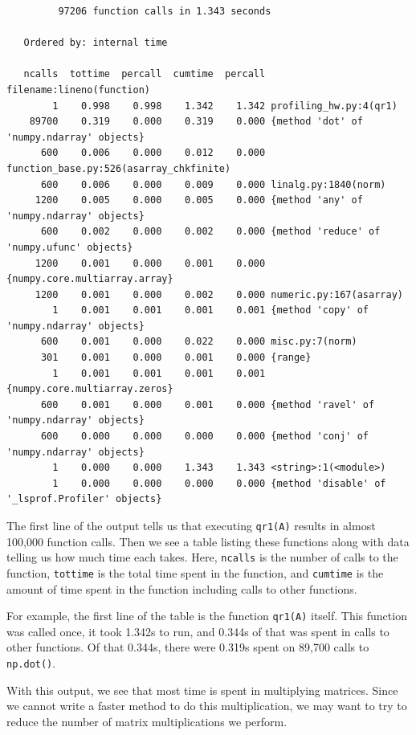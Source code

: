 {\scriptsize
\begin{verbatim}
         97206 function calls in 1.343 seconds

   Ordered by: internal time

   ncalls  tottime  percall  cumtime  percall filename:lineno(function)
        1    0.998    0.998    1.342    1.342 profiling_hw.py:4(qr1)
    89700    0.319    0.000    0.319    0.000 {method 'dot' of 'numpy.ndarray' objects}
      600    0.006    0.000    0.012    0.000 function_base.py:526(asarray_chkfinite)
      600    0.006    0.000    0.009    0.000 linalg.py:1840(norm)
     1200    0.005    0.000    0.005    0.000 {method 'any' of 'numpy.ndarray' objects}
      600    0.002    0.000    0.002    0.000 {method 'reduce' of 'numpy.ufunc' objects}
     1200    0.001    0.000    0.001    0.000 {numpy.core.multiarray.array}
     1200    0.001    0.000    0.002    0.000 numeric.py:167(asarray)
        1    0.001    0.001    0.001    0.001 {method 'copy' of 'numpy.ndarray' objects}
      600    0.001    0.000    0.022    0.000 misc.py:7(norm)
      301    0.001    0.000    0.001    0.000 {range}
        1    0.001    0.001    0.001    0.001 {numpy.core.multiarray.zeros}
      600    0.001    0.000    0.001    0.000 {method 'ravel' of 'numpy.ndarray' objects}
      600    0.000    0.000    0.000    0.000 {method 'conj' of 'numpy.ndarray' objects}
        1    0.000    0.000    1.343    1.343 <string>:1(<module>)
        1    0.000    0.000    0.000    0.000 {method 'disable' of '_lsprof.Profiler' objects}
\end{verbatim}
}


The first line of the output tells us that executing \texttt{qr1(A)} results in almost 100,000 function calls.  
Then we see a table listing these functions along with data telling us how much time each takes.
Here, \texttt{ncalls} is the number of calls to the function, \texttt{tottime} is the total time spent in the function, and \texttt{cumtime} is the amount of time spent in the function including calls to other functions.

For example, the first line of the table is the function \texttt{qr1(A)} itself. 
This function was called once, it took 1.342s to run, and 0.344s of that was spent in calls to other functions.
Of that 0.344s, there were 0.319s spent on 89,700 calls to \texttt{np.dot()}.

With this output, we see that most time is spent in multiplying matrices.
Since we cannot write a faster method to do this multiplication, we may want to try to reduce the number of matrix multiplications we perform.


